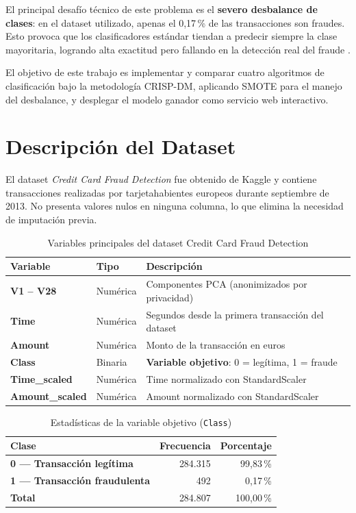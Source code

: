 \documentclass[12pt, a4paper]{article}
\begin{document}
El principal desafío técnico de este problema es el \textbf{severo
desbalance de clases}: en el dataset utilizado, apenas el 0{,}17\,\% de
las transacciones son fraudes. Esto provoca que los clasificadores estándar
tiendan a predecir siempre la clase mayoritaria, logrando alta exactitud
pero fallando en la detección real del fraude \cite{chawla2002smote}.

El objetivo de este trabajo es implementar y comparar cuatro algoritmos de
clasificación bajo la metodología CRISP-DM, aplicando SMOTE para el manejo
del desbalance, y desplegar el modelo ganador como servicio web interactivo.

\section{Descripción del Dataset}

El dataset \textit{Credit Card Fraud Detection} fue obtenido de Kaggle
\cite{kaggle_fraud} y contiene transacciones realizadas por tarjetahabientes
europeos durante septiembre de 2013. No presenta valores nulos en ninguna
columna, lo que elimina la necesidad de imputación previa.

\begin{table}[H]
\centering
\caption{Variables principales del dataset Credit Card Fraud Detection}
\small
\begin{tabular}{>{\bfseries}p{3.8cm} p{2.2cm} p{6.5cm}}
\toprule
Variable & Tipo & Descripción \\
\midrule
V1 -- V28        & Numérica   & Componentes PCA (anonimizados por privacidad) \\
Time             & Numérica   & Segundos desde la primera transacción del dataset \\
Amount           & Numérica   & Monto de la transacción en euros \\
Class            & Binaria    & \textbf{Variable objetivo}: 0 = legítima, 1 = fraude \\
Time\_scaled     & Numérica   & Time normalizado con StandardScaler \\
Amount\_scaled   & Numérica   & Amount normalizado con StandardScaler \\
\bottomrule
\end{tabular}
\label{tab:variables}
\end{table}

\begin{table}[H]
\centering
\caption{Estadísticas de la variable objetivo (\texttt{Class})}
\begin{tabular}{>{\bfseries}p{5cm} r r}
\toprule
Clase & Frecuencia & Porcentaje \\
\midrule
0 — Transacción legítima  & 284.315 & 99{,}83\,\% \\
1 — Transacción fraudulenta &    492 &  0{,}17\,\% \\
\midrule
\textbf{Total}             & 284.807 & 100{,}00\,\% \\
\bottomrule
\end{tabular}
\label{tab:clases}
\end{table}
\end{document}
